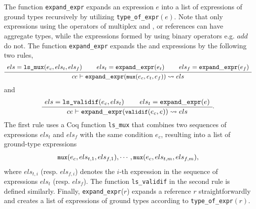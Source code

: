 {The function {\tt expand\_expr} expands an expression $e$ into a list of expressions of ground types recursively by utilizing {\tt type\_of\_expr}$(e)$.
Note that only expressions using the operators of multiplex  and
 , or references can have aggregate types, while the expressions formed by using binary operators e.g. $add$ do not.
The function {\tt expand\_expr} expands the  and
  expressions by the following two rules,
  \begin{gather*}
  \label{expand-mux}
    \inferiii[]
    {\seqq{ce\vdash{\tt expand\_expr} (\mbox{\prettyll{mux}}(e_c, e_t, e_f)) \rightsquigarrow els}}
    {\seqq{els = \mbox{\tt ls\_mux}(e_c, els_t, els_f)}}
    {\seqq{els_t = {\tt expand\_expr}(e_t)}}
    {\seqq{els_f = {\tt expand\_expr}(e_f)}}
    \end{gather*}
    and
  \begin{gather*}
  \label{expand-validif}
    \inferii[]
    {\seqq{ce\vdash{\tt expand\_expr} (\mbox{\prettyll{validif}}(e_c, e)) \rightsquigarrow els}}
    {\seqq{els  = \mbox{\tt ls\_validif}(e_c, els_t)}}
    {\seqq{els_t = {\tt expand\_expr}(e)}}.
    \end{gather*}
The first rule %
uses a Coq function {\tt ls\_mux} that combines two sequences of expressions $els_t$ and $els_f$ with the same condition $e_c$, resulting into a list of ground-type expressions
$$\mbox{\prettyll{mux}}(e_c,els_{t, 1}, els_{f, 1}), \cdots, \mbox{\prettyll{mux}}(e_c, els_{t, m}, els_{f, m}),$$
where  $els_{t,i}$ (resp. $els_{f, i}$) denotes the $i$-th expression in the sequence of expressions $els_t$ (resp. $els_f$).
The function {\tt ls\_validif} in the second rule %
is defined similarly.
%
%
Finally, {\tt expand\_expr}($r$) expands a reference $r$ straightforwardly and creates a list of expressions of ground types according to {\tt type\_of\_expr$(r)$}.

}
